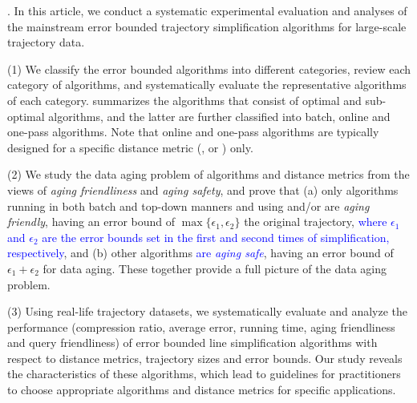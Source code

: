 {%



.
In this article, we conduct a systematic experimental evaluation and analyses of the mainstream error bounded trajectory simplification algorithms for large-scale trajectory data.

\stab (1) We classify the error bounded \lsa algorithms into different categories, review each category of algorithms, and systematically evaluate the representative algorithms of each category.
%
 summarizes the algorithms that consist of optimal and sub-optimal algorithms, and the latter are further classified into batch, online and one-pass algorithms.
Note that online and one-pass algorithms are typically designed for a specific distance metric  (\ped, \sed or \dad) only.

\stab (2) {We study the data aging problem of \lsa algorithms and distance metrics from the views of \emph{aging friendliness} and \emph{aging safety}, and prove that (a) only algorithms running in both batch and top-down manners and using \ped and/or \sed are \emph{aging friendly}, having an error bound of $\max{\{\epsilon_1, \epsilon_2\}}$ \wrt the original trajectory, \textcolor{blue}{where $\epsilon_1$ and $\epsilon_2$ are the error bounds set in the first and second times of simplification, respectively}, and (b) other algorithms \textcolor{blue}{are \emph{aging safe}}, having an error bound of ${\epsilon_1+\epsilon_2}$ for data aging.  These together provide a full picture of the data aging problem.}

\stab (3) Using real-life trajectory datasets, we systematically evaluate and analyze the performance (compression ratio, average error, running time, {aging friendliness and query friendliness}) of error bounded line simplification algorithms with respect to {distance metrics,} trajectory sizes and error bounds.
Our study reveals the characteristics of these algorithms, which lead to guidelines for practitioners to choose appropriate algorithms and distance metrics for specific applications.


}

